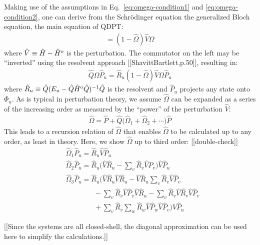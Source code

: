 \documentclass[amsmath, amssymb, aps, floatfix, nofootinbib, preprintnumbers,showpacs, superscriptaddress, twocolumn]{revtex4-1}
\begin{document}
Making use of the assumptions in Eq.\ \eqref{eq:omega-condition1} and
\eqref{eq:omega-condition2}, one can derive from the Schr\"odinger equation
the generalized Bloch equation, the main equation of QDPT:
\begin{gather*}
  [\hat \Omega, \hat H^{\text o}] =
  (1 - \hat \Omega) \hat V \Omega
\end{gather*}
where $\hat V \equiv \hat H - \hat H^{\text o}$ is the perturbation.  The
commutator on the left may be ``inverted'' using the resolvent approach
[[ShavittBartlett,p.50]], resulting in:
\begin{align*}
  \hat Q \Omega \hat P_u =
  \hat R_u (1 - \hat \Omega) \hat V \Omega \hat P_u
\end{align*}
where
$\hat R_u \equiv \hat Q (E_u - \hat Q \hat H^{\text o} \hat Q)^{-1} \hat Q$ is
the resolvent and $\hat P_u$ projects any state onto $\Phi_u$.  As is typical
in perturbation theory, we assume $\hat \Omega$ can be expanded as a series of
the increasing order as measured by the ``power'' of the perturbation
$\hat V$:
\begin{align*}
  \hat \Omega = \hat P +
  \hat Q\bigl(\hat \Omega_1 + \hat \Omega_2 + \cdots\bigr) \hat P
\end{align*}
This leads to a recursion relation of $\hat \Omega$ that enables $\hat \Omega$
to be calculated up to any order, as least in theory.  Here, we show
$\hat \Omega$ up to third order: [[double-check]]
\begin{align*}
  &\hat \Omega_1 \hat P_u = \hat R_u \hat V \hat P_u \\
  &\hat \Omega_2 \hat P_u =
    \hat R_u \biggl(
    \hat V \hat R_u
    - \sum_v \hat R_v \hat V \hat P_v
    \biggr) \hat V \hat P_u \\
  &\hat \Omega_3 \hat P_u =
    \hat R_u \biggl(
    \hat V \hat R_u \hat V \hat R_u
    - \hat V \hat R_u \sum_v \hat R_v \hat V \hat P_v \\
  &\qquad\qquad
    - \sum_v \hat R_v \hat V \hat P_v \hat V \hat R_u
    - \sum_v \hat R_v \hat V \hat R_v \hat V \hat P_v \\
  &\qquad\qquad
    + \sum_v \hat R_v \sum_w \hat R_w \hat V \hat P_w \hat V \hat P_v
    \biggr) \hat V \hat P_u
\end{align*}

[[Since the systems are all closed-shell, the
diagonal approximation can be used here to simplify the calculations.]]
\end{document}
